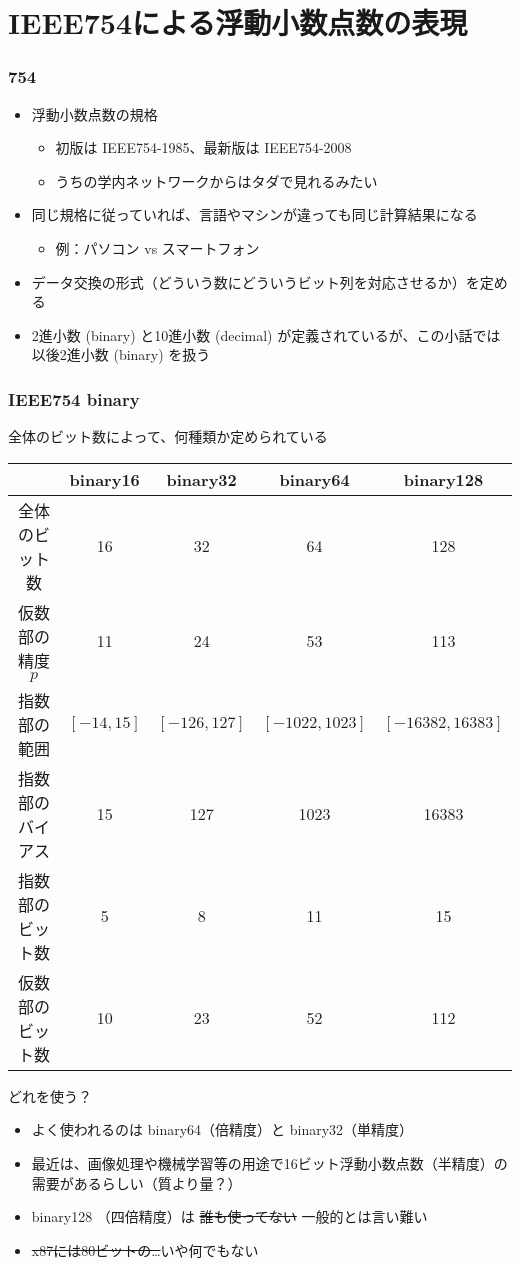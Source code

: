 \documentclass[aspectratio=169]{beamer}
\begin{document}
\section{IEEE754による浮動小数点数の表現}
\begin{frame}\frametitle{754}
  \begin{itemize}
  \item 浮動小数点数の規格
    \begin{itemize}
    \item 初版は IEEE754-1985、最新版は IEEE754-2008
    \item うちの学内ネットワークからはタダで見れるみたい
    \end{itemize}
  \item 同じ規格に従っていれば、言語やマシンが違っても同じ計算結果になる
    \begin{itemize}
    \item 例：パソコン vs スマートフォン
    \end{itemize}
  \item データ交換の形式（どういう数にどういうビット列を対応させるか）を定める
  \item 2進小数 (binary) と10進小数 (decimal) が定義されているが、この小話では以後2進小数 (binary) を扱う
  \end{itemize}
\end{frame}

\begin{frame}\frametitle{IEEE754 binary}
  全体のビット数によって、何種類か定められている
  \begin{tabular}{|c|c|c|c|c|} \hline
    & binary16 & binary32 & binary64 & binary128 \\ \hline
    全体のビット数 & 16 & 32 & 64 & 128 \\ \hline
    仮数部の精度 \(p\) & 11 & 24 & 53 & 113 \\ \hline
    指数部の範囲 & \([-14,15]\) & \([-126,127]\) & \([-1022,1023]\) & \([-16382,16383]\) \\ \hline \hline
    指数部のバイアス & 15 & 127 & 1023 & 16383 \\ \hline
    指数部のビット数 & 5 & 8 & 11 & 15 \\ \hline
    仮数部のビット数 & 10 & 23 & 52 & 112 \\ \hline
  \end{tabular}

  \begin{block}{どれを使う？}
    \begin{itemize}
    \item よく使われるのは binary64（倍精度）と binary32（単精度）
    \item 最近は、画像処理や機械学習等の用途で16ビット浮動小数点数（半精度）の需要があるらしい（質より量？）
    \item binary128 （四倍精度）は \sout{誰も使ってない} 一般的とは言い難い
    \item \sout{x87には80ビットの…}{\tiny いや何でもない}
    \end{itemize}
  \end{block}
\end{frame}
\end{document}
